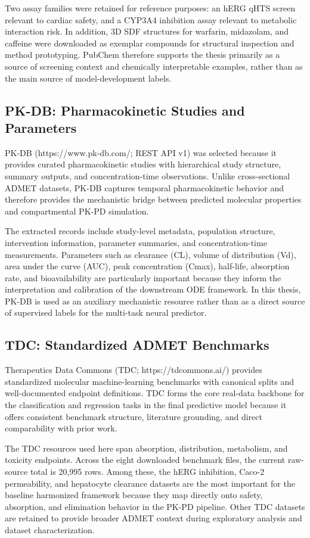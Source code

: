 \documentclass[a4paper,11pt,twoside]{report}
\begin{document}
Two assay families were retained for reference purposes: an hERG qHTS screen relevant to cardiac safety, and a CYP3A4 inhibition assay relevant to metabolic interaction risk. In addition, 3D SDF structures for warfarin, midazolam, and caffeine were downloaded as exemplar compounds for structural inspection and method prototyping. PubChem therefore supports the thesis primarily as a source of screening context and chemically interpretable examples, rather than as the main source of model-development labels.

\subsection{PK-DB: Pharmacokinetic Studies and Parameters}

PK-DB (https://www.pk-db.com/; REST API v1) was selected because it provides curated pharmacokinetic studies with hierarchical study structure, summary outputs, and concentration-time observations. Unlike cross-sectional ADMET datasets, PK-DB captures temporal pharmacokinetic behavior and therefore provides the mechanistic bridge between predicted molecular properties and compartmental PK-PD simulation.

The extracted records include study-level metadata, population structure, intervention information, parameter summaries, and concentration-time measurements. Parameters such as clearance (CL), volume of distribution (Vd), area under the curve (AUC), peak concentration (Cmax), half-life, absorption rate, and bioavailability are particularly important because they inform the interpretation and calibration of the downstream ODE framework. In this thesis, PK-DB is used as an auxiliary mechanistic resource rather than as a direct source of supervised labels for the multi-task neural predictor.

\subsection{TDC: Standardized ADMET Benchmarks}

Therapeutics Data Commons (TDC; https://tdcommons.ai/) provides standardized molecular machine-learning benchmarks with canonical splits and well-documented endpoint definitions. TDC forms the core real-data backbone for the classification and regression tasks in the final predictive model because it offers consistent benchmark structure, literature grounding, and direct comparability with prior work.

The TDC resources used here span absorption, distribution, metabolism, and toxicity endpoints. Across the eight downloaded benchmark files, the current raw-source total is 20,995 rows. Among these, the hERG inhibition, Caco-2 permeability, and hepatocyte clearance datasets are the most important for the baseline harmonized framework because they map directly onto safety, absorption, and elimination behavior in the PK-PD pipeline. Other TDC datasets are retained to provide broader ADMET context during exploratory analysis and dataset characterization.
\end{document}
